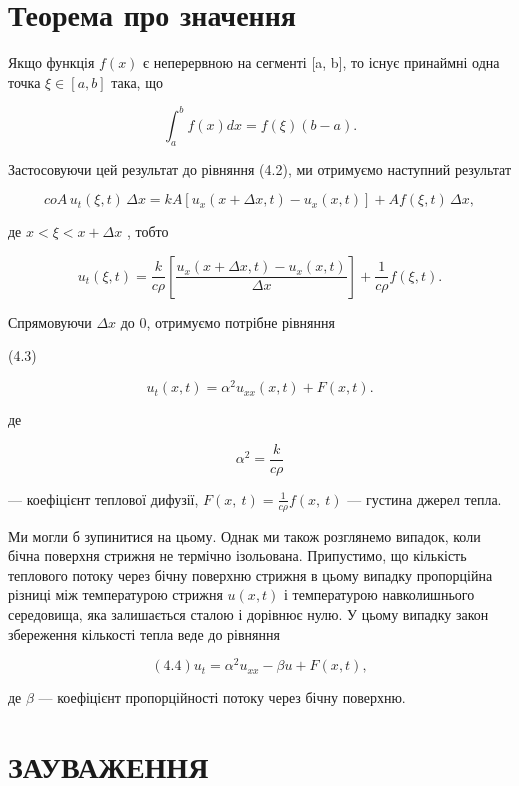 \documentclass[
  ukrainian,
]{article}
\begin{document}
\section{Теорема про
значення}\label{ux442ux435ux43eux440ux435ux43cux430-ux43fux440ux43e-ux437ux43dux430ux447ux435ux43dux43dux44f}

Якщо функція \(f(x)\) є неперервною на сегменті {[}a, b{]}, то існує
принаймні одна точка \(\xi \in [a, b]\) така, що

\[
\int_{a}^{b} f(x) dx = f(\xi) (b-a).
\]

Застосовуючи цей результат до рівняння (4.2), ми отримуємо наступний
результат

\[
coA\,u_t(\xi, t)\,\Delta x = kA\left[u_x(x + \Delta x, t) - u_x(x, t)\right] + Af(\xi, t)\,\Delta x,
\]

де \(x < \xi < x + \Delta x\) , тобто

\[
u_t(\xi, t) = \frac{k}{c\rho}\left[\frac{u_x(x + \Delta x, t) - u_x(x, t)}{\Delta x}\right] + \frac{1}{c\rho} f(\xi, t).
\]

Спрямовуючи \(\Delta x\) до 0, отримуємо потрібне рівняння

(4.3)

\[
u_t(x, t) = \alpha^2 u_{xx}(x, t) + F(x, t).
\]

де

\[
\alpha^{2}=\frac{k}{c\rho}
\]

--- коефіцієнт теплової дифузії,
\(F\left(x,\ t\right)=\frac{1}{c\rho}f\left(x,\ t\right)\) --- густина
джерел тепла.

Ми могли б зупинитися на цьому. Однак ми також розглянемо випадок, коли
бічна поверхня стрижня не термічно ізольована. Припустимо, що кількість
теплового потоку через бічну поверхню стрижня в цьому випадку
пропорційна різниці між температурою стрижня \(u(x,t)\) і температурою
навколишнього середовища, яка залишається сталою і дорівнює нулю. У
цьому випадку закон збереження кількості тепла веде до рівняння

\[
(4.4) u_t = \alpha^2 u_{xx} - \beta u + F(x, t),
\]

де \(\beta\) --- коефіцієнт пропорційності потоку через бічну поверхню.

\section{ЗАУВАЖЕННЯ}\label{ux437ux430ux443ux432ux430ux436ux435ux43dux43dux44f-3}
\end{document}
